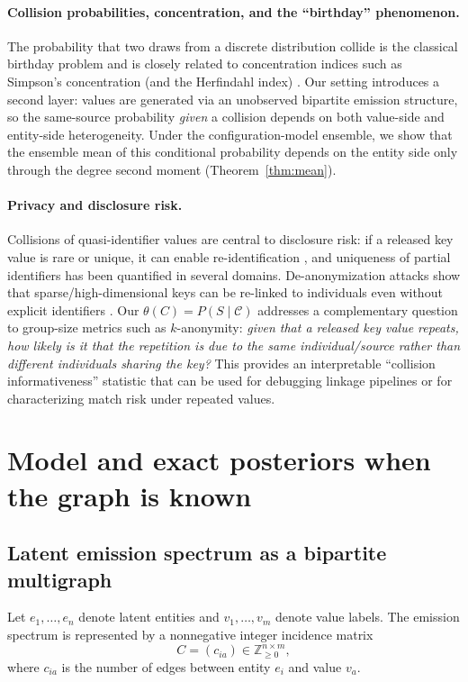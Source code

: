 \documentclass[11pt]{article}
\newcommand{\1}{\mathbf{1}}
\newcommand{\Z}{\mathbb{Z}}
\newcommand{\coll}{\mathcal{C}} %
\theoremstyle{plain}
\theoremstyle{definition}
\begin{document}
\paragraph{Collision probabilities, concentration, and the ``birthday'' phenomenon.}
The probability that two draws from a discrete distribution collide is the classical birthday problem and is
closely related to concentration indices such as Simpson's concentration (and the Herfindahl index)
\cite{simpson1949,flajolet1992birthday}.
Our setting introduces a second layer: values are generated via an unobserved bipartite emission structure,
so the same-source probability \emph{given} a collision depends on both value-side and entity-side heterogeneity.
Under the configuration-model ensemble, we show that the ensemble mean of this conditional probability depends
on the entity side only through the degree second moment (Theorem~\ref{thm:mean}).

\paragraph{Privacy and disclosure risk.}
Collisions of quasi-identifier values are central to disclosure risk: if a released key value is rare or unique,
it can enable re-identification \cite{sweeney2002}, and uniqueness of partial identifiers has been quantified in several domains.
De-anonymization attacks show that sparse/high-dimensional keys can be re-linked to individuals even without explicit identifiers
\cite{narayanan2008}.
Our $\theta(C)=P(S\mid \coll)$ addresses a complementary question to group-size metrics such as $k$-anonymity:
\emph{given that a released key value repeats, how likely is it that the repetition is due to the same individual/source rather than different individuals sharing the key?}
This provides an interpretable ``collision informativeness'' statistic that can be used for debugging linkage pipelines or
for characterizing match risk under repeated values.

\section{Model and exact posteriors when the graph is known}

\subsection{Latent emission spectrum as a bipartite multigraph}
Let $e_1,\dots,e_n$ denote latent entities and $v_1,\dots,v_m$ denote value labels.
The emission spectrum is represented by a nonnegative integer incidence matrix
\[
C = (c_{ia}) \in \Z_{\ge 0}^{n\times m},
\]
where $c_{ia}$ is the number of edges between entity $e_i$ and value $v_a$.
\end{document}

